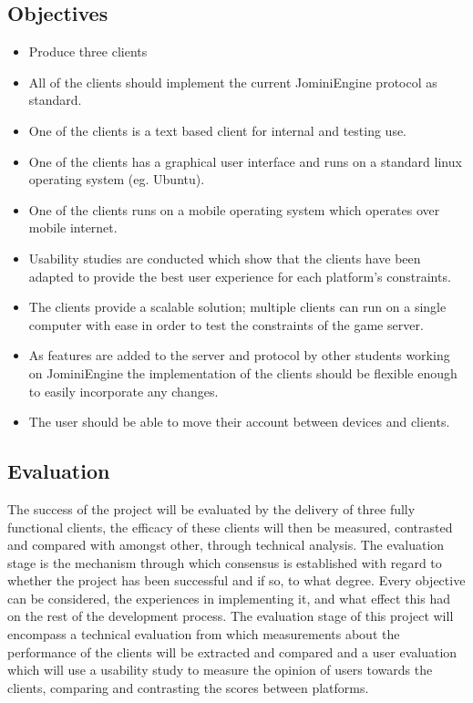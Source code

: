\documentclass{article}
\begin{document}
	\subsection{Objectives}
	\begin{itemize}
	\item Produce three clients
	\item All of the clients should implement the current JominiEngine protocol as standard.
	\item One of the clients is a text based client for internal and testing use.
	\item One of the clients has a graphical user interface and runs on a standard linux operating system (eg. Ubuntu).
	\item One of the clients runs on a mobile operating system which operates over mobile internet.
	\item Usability studies are conducted which show that the clients have been adapted to provide the best user experience for each platform’s constraints.
	\item The clients provide a scalable solution; multiple clients can run on a single computer with ease in order to test the constraints of the game server.
	\item As features are added to the server and protocol by other students working on JominiEngine the implementation of the clients should be flexible enough to easily incorporate any changes.
	\item The user should be able to move their account between devices and clients.
\end{itemize}
	\subsection{Evaluation}
	The success of the project will be evaluated by the delivery of three fully functional clients, the efficacy of these clients will then be measured, contrasted and compared with amongst other, through technical analysis. The evaluation stage is the mechanism through which consensus is established with regard to whether the project has been successful and if so, to what degree. Every objective can be considered, the experiences in implementing it, and what effect this had on the rest of the development process. The evaluation stage of this project will encompass a technical evaluation from which measurements about the performance of the clients will be extracted and compared and a user evaluation which will use a usability study to measure the opinion of users towards the clients, comparing and contrasting the scores between platforms.
	\newpage 
\end{document}
